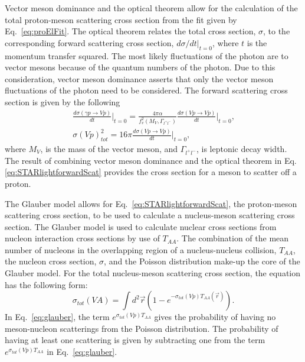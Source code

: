     Vector meson dominance and the optical theorem allow for the calculation of 
      the total proton-meson scattering cross section from the fit given by 
      Eq.~\ref{eq:proElFit}. 
    The optical theorem relates the total cross section, $\sigma$, 
      to the corresponding forward scattering cross section, 
      $d\sigma/dt|_{t=0}$, where $t$ is the momentum transfer squared.
    The most likely fluctuations of the photon are to vector mesons because of 
      the quantum numbers of the photon.
    Due to this consideration, vector meson dominance asserts that only the 
      vector meson fluctuations of the photon need to be considered. 
    The forward scattering cross section is given by the following
    \begin{eqnarray} \label{eq:STARlightforwardScat}
      \frac{d\sigma(\gamma p\rightarrow Vp)}{dt}\Big|_{t=0}=
      \frac{4\pi \alpha}{f^{2}_{v}(M_{V},\Gamma_{l^{+}l^{-}})}\frac{d\sigma(Vp\rightarrow Vp)}{dt}
        \Big|_{t=0} \textrm{,} \nonumber \\
      \sigma(Vp)_{tot}^{2}=16\pi\frac{d\sigma(Vp\rightarrow Vp)}{dt}\Big|_{t=0} \textrm{,}
    \end{eqnarray}
      where $M_{V}$, is the mass of the vector meson, and $\Gamma_{l^{+}l^{-}}$, 
      is leptonic decay width. 
    The result of combining vector meson dominance and the optical theorem 
      in Eq.\ref{eq:STARlightforwardScat} provides the cross section for a meson to 
      scatter off a proton.

    The Glauber model allows for Eq.~\ref{eq:STARlightforwardScat}, the proton-meson
      scattering cross section, to be used to calculate a nucleus-meson 
      scattering cross section. 
    The Glauber model is used to calculate nuclear cross sections from 
      nucleon interaction cross sections by use of $T_{AA}$. 
    The combination of the mean number of nucleons in the overlapping region
      of a nucleus-nucleus collision, $T_{AA}$, the nucleon cross section, 
      $\sigma$, and the Poisson distribution make-up the core of the Glauber 
      model. 
    For the total nucleus-meson scattering cross section, the equation has the 
      following form:
    \begin{equation} \label{eq:glauber}
      \sigma_{tot}(VA)=\int d^{2}\vec{r}(1-e^{-\sigma_{tot}(Vp)T_{AA}(\vec{r})}).
    \end{equation}
    In Eq.~\ref{eq:glauber}, the term $e^{\sigma_{tot}(Vp)T_{AA}}$ gives the
      probability of having no meson-nucleon scatterings from the Poisson 
      distribution. 
    The probability of having at least one scattering is given by subtracting 
      one from the term  $e^{\sigma_{tot}(Vp)T_{AA}}$ in Eq.~\ref{eq:glauber}.

